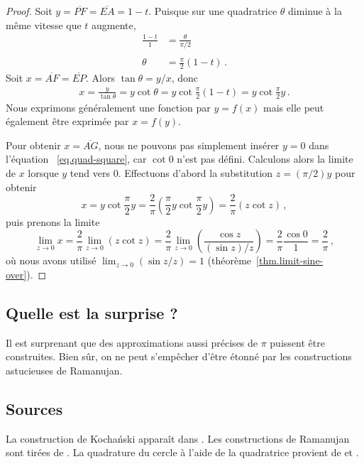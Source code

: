 \begin{proof}
Soit  $y=\overline{PF}=\overline{EA}=1-t$. Puisque sur une quadratrice $\theta$ diminue à la même vitesse que $t$ augmente,
\begin{align*}
\frac{1-t}{1} &= \frac{\theta}{\pi/2}\\
&\\
\theta &=\frac{\pi}{2}(1-t)\,.
\end{align*}
Soit  $x=\overline{AF}=\overline{EP}$. Alors $\tan \theta = y/x$, donc 
\begin{align}\label{eq.quad-square}
x = \frac{y}{\tan\theta}=y\cot\theta=y\cot \frac{\pi}{2}(1-t)=y\cot \frac{\pi}{2}y\,.
\end{align}
Nous exprimons généralement une fonction par $y=f(x)$ mais elle peut également être exprimée par $x=f(y)$. 

Pour obtenir $x=\overline{AG}$, nous ne pouvons pas simplement insérer $y=0$ dans l'équation ~\ref{eq.quad-square}, car $\cot 0$ n'est pas défini.  Calculons alors la limite de $x$ lorsque $y$ tend vers $0$. 
Effectuons d'abord la substitution $z=(\pi/2)y$ pour obtenir 
\[
x = y\cot \frac{\pi}{2}y = \frac{2}{\pi} \left(\frac{\pi}{2}y\cot \frac{\pi}{2}y\right)=\frac{2}{\pi}(z\cot z)\,,
\]
puis prenons la limite 
\[
\lim_{z\rightarrow 0} x=\frac{2}{\pi}\lim_{z\rightarrow 0} (z\cot z) = \frac{2}{\pi}\lim_{z\rightarrow 0} \left(\frac{\cos z}{(\sin z)/z}\right) = \frac{2}{\pi}\frac{\cos 0}{1} = \frac{2}{\pi}\,,
\]
où nous avons utilisé 
 $\lim_{z\rightarrow 0} (\sin z/z)=1$ (théorème~\ref{thm.limit-sine-over}).
\end{proof}

\subsection*{Quelle est la surprise ?}

Il est surprenant que des approximations aussi précises de $\pi$ puissent être construites. Bien sûr, on ne peut s'empêcher d'être étonné par les constructions astucieuses de Ramanujan.

\subsection*{Sources}
La construction de Kocha\'{n}ski apparaît dans \cite{bold}. Les constructions de Ramanujan sont tirées de \cite{ramanujan1,ramanujan2}. La quadrature du cercle à l'aide de la  quadratrice provient de \cite[p.~48--49]{martin} et \cite{wiki:quad}.
